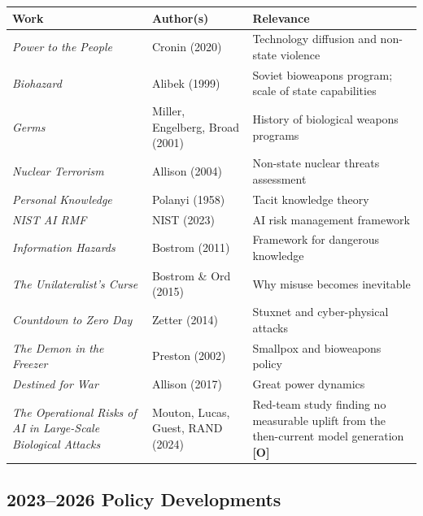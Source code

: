 \documentclass[11pt,letterpaper]{article}
\begin{document}
\begin{center}
\small
\begin{tabular}{L{4.5cm}L{3.5cm}L{4cm}}
\toprule
\textbf{Work} & \textbf{Author(s)} & \textbf{Relevance} \\
\midrule
\textit{Power to the People} & Cronin (2020) & Technology diffusion and non-state violence \\
\textit{Biohazard} & Alibek (1999) & Soviet bioweapons program; scale of state capabilities \\
\textit{Germs} & Miller, Engelberg, Broad (2001) & History of biological weapons programs \\
\textit{Nuclear Terrorism} & Allison (2004) & Non-state nuclear threats assessment \\
\textit{Personal Knowledge} & Polanyi (1958) & Tacit knowledge theory \\
\textit{NIST AI RMF} & NIST (2023) & AI risk management framework \\
\textit{Information Hazards} & Bostrom (2011) & Framework for dangerous knowledge \\
\textit{The Unilateralist's Curse} & Bostrom \& Ord (2015) & Why misuse becomes inevitable \\
\textit{Countdown to Zero Day} & Zetter (2014) & Stuxnet and cyber-physical attacks \\
\textit{The Demon in the Freezer} & Preston (2002) & Smallpox and bioweapons policy \\
\textit{Destined for War} & Allison (2017) & Great power dynamics \\
\textit{The Operational Risks of AI in Large-Scale Biological Attacks} & Mouton, Lucas, Guest, RAND (2024) & Red-team study finding no measurable uplift from the then-current model generation \textbf{[O]} \\
\bottomrule
\end{tabular}
\end{center}

\subsection{2023--2026 Policy Developments}
\end{document}
